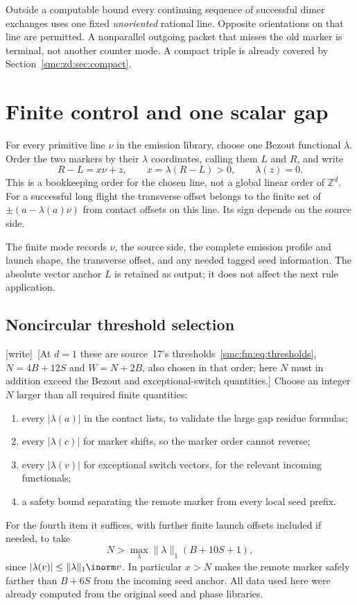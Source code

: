 \documentclass[11pt,letterpaper]{article}
\numberwithin{equation}{section}
\theoremstyle{definition}
\theoremstyle{remark}
\newcommand{\Z}{\mathbb Z}
\newcommand{\wtag}{\textup{[write]}}
\begin{document}
Outside a computable bound every continuing sequence of successful dimer exchanges uses one fixed \emph{unoriented} rational line. Opposite orientations on that line are permitted. A nonparallel outgoing packet that misses the old marker is terminal, not another counter mode. A compact triple is already covered by Section~\ref{smc:zd:sec:compact}.

\section{Finite control and one scalar gap}\label{smc:zd:sec:counter}
For every primitive line $\nu$ in the emission library, choose one Bezout functional $\lambda$. Order the two markers by their $\lambda$ coordinates, calling them $L$ and $R$, and write
\begin{equation}\label{smc:zd:eq:gap}
 R-L=x\nu+z,\qquad x=\lambda(R-L)>0,\qquad\lambda(z)=0.
\end{equation}
This is a bookkeeping order for the chosen line, not a global linear order of $\Z^d$. For a successful long flight the transverse offset belongs to the finite set of $\pm(a-\lambda(a)\nu)$ from contact offsets on this line. Its sign depends on the source side.

The finite mode records $\nu$, the source side, the complete emission profile and launch shape, the transverse offset, and any needed tagged seed information. The absolute vector anchor $L$ is retained as output; it does not affect the next rule application.

\subsection{Noncircular threshold selection}\label{smc:zd:sec:thresholds}
\wtag\ [At $d=1$ these are source~17's thresholds~\eqref{smc:fm:eq:thresholds}, $N=4B+12S$ and $W=N+2B$, also chosen in that order; here $N$ must in addition exceed the Bezout and exceptional-switch quantities.]
Choose an integer $N$ larger than all required finite quantities:
\begin{enumerate}
\item every $|\lambda(a)|$ in the contact lists, to validate the large gap residue formulas;
\item every $|\lambda(c)|$ for marker shifts, so the marker order cannot reverse;
\item every $|\lambda(v)|$ for exceptional switch vectors, for the relevant incoming functionals;
\item a safety bound separating the remote marker from every local seed prefix.
\end{enumerate}
For the fourth item it suffices, with further finite launch offsets included if needed, to take
\[
 N>\max_{\lambda}\lVert\lambda\rVert_1(B+10S+1),
\]
since $|\lambda(v)|\le\lVert\lambda\rVert_1\inorm v$. In particular $x>N$ makes the remote marker safely farther than $B+6S$ from the incoming seed anchor. All data used here were already computed from the original seed and phase libraries.
\end{document}
